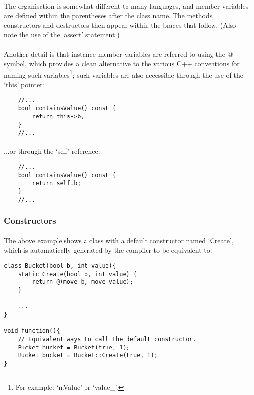 \documentclass[12pt,twoside,notitlepage]{report}
\begin{document}
\paragraph{}
The organisation is somewhat different to many languages, and member variables are defined within the parentheses after the class name. The methods, constructors and destructors then appear within the braces that follow. (Also note the use of the `assert' statement.)

\paragraph{}
Another detail is that instance member variables are referred to using the @ symbol, which provides a clean alternative to the various C++ conventions for naming such variables\footnote{For example: `mValue' or `value\_'.}; such variables are also accessible through the use of the `this' pointer:


\begin{lstlisting}
	//...
	bool containsValue() const {
		return this->b;
	}
	//...
\end{lstlisting}


\paragraph{}
...or through the `self' reference:


\begin{lstlisting}
	//...
	bool containsValue() const {
		return self.b;
	}
	//...
\end{lstlisting}


\subsubsection{Constructors}

\paragraph{}
The above example shows a class with a default constructor named `Create', which is automatically generated by the compiler to be equivalent to:
 
\begin{lstlisting}
class Bucket(bool b, int value){
	static Create(bool b, int value) {
		return @(move b, move value);
	}

	...
}

void function(){
	// Equivalent ways to call the default constructor.
	Bucket bucket = Bucket(true, 1);
	Bucket bucket = Bucket::Create(true, 1);
}
\end{lstlisting}
\end{document}
